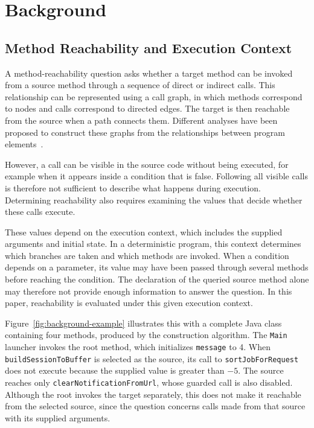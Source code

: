 \section{Background}
\label{sec:background}

\subsection{Method Reachability and Execution Context}

A method-reachability question asks whether a target method can be invoked from a source method through a sequence of direct or indirect calls. This relationship can be represented using a call graph, in which methods correspond to nodes and calls correspond to directed edges. The target is then reachable from the source when a path connects them. Different analyses have been proposed to construct these graphs from the relationships between program elements~\cite{grove2001framework,tip2000scalable}.

However, a call can be visible in the source code without being executed, for example when it appears inside a condition that is false. Following all visible calls is therefore not sufficient to describe what happens during execution. Determining reachability also requires examining the values that decide whether these calls execute.

These values depend on the execution context, which includes the supplied arguments and initial state. In a deterministic program, this context determines which branches are taken and which methods are invoked. When a condition depends on a parameter, its value may have been passed through several methods before reaching the condition. The declaration of the queried source method alone may therefore not provide enough information to answer the question. In this paper, reachability is evaluated under this given execution context.



Figure~\ref{fig:background-example} illustrates this with a complete Java class containing four methods, produced by the construction algorithm. The \texttt{Main} launcher invokes the root method, which initializes \texttt{message} to 4. When \texttt{buildSessionToBuffer} is selected as the source, its call to \texttt{sortJobForRequest} does not execute because the supplied value is greater than $-5$. The source reaches only \texttt{clearNotificationFromUrl}, whose guarded call is also disabled. Although the root invokes the target separately, this does not make it reachable from the selected source, since the question concerns calls made from that source with its supplied arguments.


